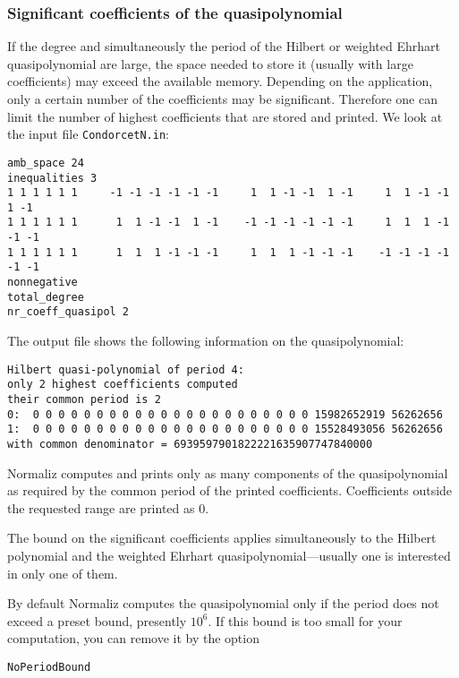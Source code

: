 \subsubsection{Significant coefficients of the quasipolynomial}\label{highest_coeff}

If the degree and simultaneously the period of the Hilbert or weighted Ehrhart quasipolynomial are large, the space needed to store it (usually with large coefficients) may exceed the available memory. Depending on the application, only a certain number of the coefficients may be significant. Therefore one can limit the number of highest coefficients that are stored and printed. We look at the input file \texttt{CondorcetN.in}:
\begin{Verbatim}
amb_space 24
inequalities 3
1 1 1 1 1 1     -1 -1 -1 -1 -1 -1     1  1 -1 -1  1 -1     1  1 -1 -1  1 -1
1 1 1 1 1 1      1  1 -1 -1  1 -1    -1 -1 -1 -1 -1 -1     1  1  1 -1 -1 -1
1 1 1 1 1 1      1  1  1 -1 -1 -1     1  1  1 -1 -1 -1    -1 -1 -1 -1 -1 -1
nonnegative
total_degree
nr_coeff_quasipol 2
\end{Verbatim}

The output file shows the following information on the quasipolynomial:
\begin{Verbatim}
Hilbert quasi-polynomial of period 4:
only 2 highest coefficients computed
their common period is 2
0:  0 0 0 0 0 0 0 0 0 0 0 0 0 0 0 0 0 0 0 0 0 0 15982652919 56262656
1:  0 0 0 0 0 0 0 0 0 0 0 0 0 0 0 0 0 0 0 0 0 0 15528493056 56262656
with common denominator = 6939597901822221635907747840000
\end{Verbatim}
Normaliz computes and prints only as many components of the quasipolynomial as required by the common period of the printed coefficients. Coefficients outside the requested range are printed as $0$.

The bound on the significant coefficients applies simultaneously to the Hilbert polynomial and the weighted Ehrhart quasipolynomial---usually one is interested in only one of them.

By default Normaliz computes the quasipolynomial only if the period does not exceed a preset bound, presently $10^6$. If this bound is too small for your computation, you can remove it by the option
\begin{Verbatim}
NoPeriodBound
\end{Verbatim}



